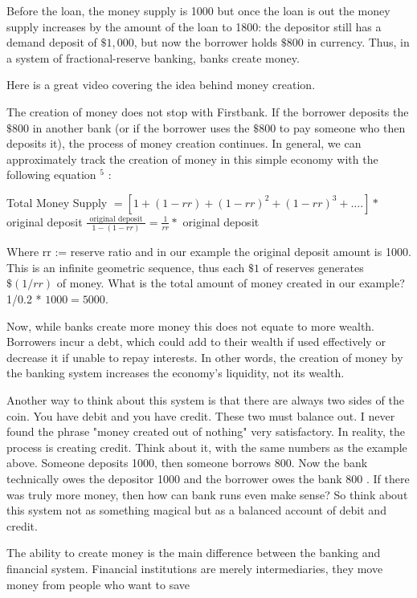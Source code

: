 \documentclass[10pt]{article}
\begin{document}
Before the loan, the money supply is 1000 but once the loan is out the money supply increases by the amount of the loan to 1800: the depositor still has a demand deposit of $\$ 1,000$, but now the borrower holds $\$ 800$ in currency. Thus, in a system of fractional-reserve banking, banks create money.

Here is a great video covering the idea behind money creation.

The creation of money does not stop with Firstbank. If the borrower deposits the $\$ 800$ in another bank (or if the borrower uses the $\$ 800$ to pay someone who then deposits it), the process of money creation continues. In general, we can approximately track the creation of money in this simple economy with the following equation ${ }^{5}$ :

Total Money Supply $=\left[1+(1-r r)+(1-r r)^{2}+(1-r r)^{3}+\ldots.\right] *$ original deposit $\frac{\text { original deposit }}{1-(1-r r)}=\frac{1}{r r} *$ original deposit

Where rr := reserve ratio and in our example the original deposit amount is 1000. This is an infinite geometric sequence, thus each $\$ 1$ of reserves generates $\$(1 / r r)$ of money. What is the total amount of money created in our example? 1/0.2 * $1000=5000$.

Now, while banks create more money this does not equate to more wealth. Borrowers incur a debt, which could add to their wealth if used effectively or decrease it if unable to repay interests. In other words, the creation of money by the banking system increases the economy's liquidity, not its wealth.

Another way to think about this system is that there are always two sides of the coin. You have debit and you have credit. These two must balance out. I never found the phrase "money created out of nothing" very satisfactory. In reality, the process is creating credit. Think about it, with the same numbers as the example above. Someone deposits 1000, then someone borrows 800. Now the bank technically owes the depositor 1000 and the borrower owes the bank 800 . If there was truly more money, then how can bank runs even make sense? So think about this system not as something magical but as a balanced account of debit and credit.

The ability to create money is the main difference between the banking and financial system. Financial institutions are merely intermediaries, they move money from people who want to save
\end{document}
